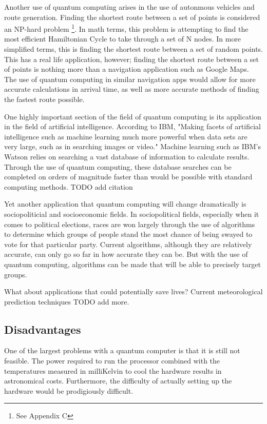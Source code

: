 \documentclass[10pt,journal,compsoc]{IEEEtran}
\begin{document}
Another use of quantum computing arises in the use of autonmous vehicles and route generation. Finding the shortest route between a set of points is considered an NP-hard problem
\footnote{See Appendix C }.
In math terms, this problem is attempting to find the most efficient Hamiltonian Cycle to take through a set of N nodes. In more simplified terms, this is finding the shortest route between a set of random points. This has a real life application, however; finding the shortest route between a set of points is nothing more than a navigation application such as Google Maps. The use of quantum computing in similar navigation apps would allow for more accurate calculations in arrival time, as well as more accurate methods of finding the fastest route possible. 
 
One highly important section of the field of quantum computing is its application in the field of artificial intelligence. According to IBM, "Making facets of artificial intelligence such as machine learning much more powerful when data sets are very large, such as in searching images or video." Machine learning such as IBM's Watson relies on searching a vast database of information to calculate results. Through the use of quantum computing, these database searches can be completed on orders of magnitude faster than would be possible with standard computing methods\cite{IBM}. TODO add citation

Yet another application that quantum computing will change dramatically is sociopoliticial and socioeconomic fields. In sociopolitical fields, especially when it comes to political elections, races are won largely through the use of algorithms to determine which groups of people stand the most chance of being swayed to vote for that particular party. Current algorithms, although they are relatively accurate, can only go so far in how accurate they can be. But with the use of quantum computing, algorithms can be made that will be able to precisely target groups. 

What about applications that could potentially save lives? Current meteorological prediction techniques
 TODO add more. 
\subsection{Disadvantages}
One of the largest problems with a quantum computer is that it is still not feasible. The power required to run the processor combined with the temperatures measured in milliKelvin to cool the hardware results in astronomical costs. Furthermore, the difficulty of actually setting up the hardware would be prodigiously difficult. 
\end{document}
